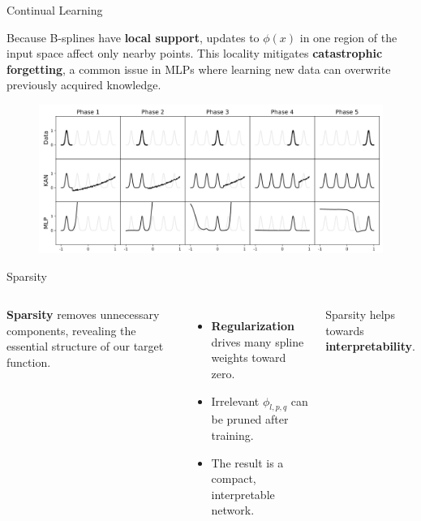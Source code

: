 \documentclass[aspectratio=169]{beamer}
\begin{document}

\begin{frame}{Continual Learning}
	
	Because B-splines have \textbf{local support}, updates to $\phi(x)$ in one region of the input space affect only nearby points.  
	This locality mitigates \textbf{catastrophic forgetting}, a common issue in MLPs where learning new data can overwrite previously acquired knowledge.
	
	\begin{figure}
		\centering
		\includegraphics[height=0.6\textheight]{../images/continual_learning.png}
	\end{figure}
	
\end{frame}



\begin{frame}{Sparsity}
	\begin{columns}[T,onlytextwidth]
		
		
		\textbf{Sparsity} removes unnecessary components, revealing the essential structure of our target function.
		
		\vspace{0.6em}
		\begin{itemize}
			\item \textbf{Regularization} drives many spline weights toward zero.
			\item Irrelevant $\phi_{l,p,q}$ can be pruned after training.
			\item The result is a compact, interpretable network.
		\end{itemize}
		
		Sparsity helps towards \textbf{interpretability}.
		
		\centering
		\resizebox{!}{0.75\textheight}{}
		
	\end{columns}
\end{frame}
\end{document}
